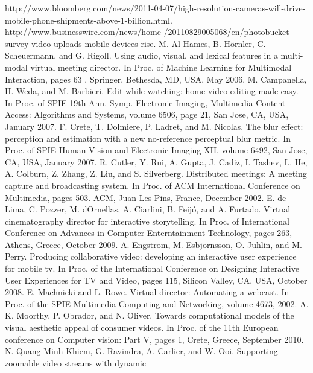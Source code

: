 \documentclass{new}
\begin{document}
\begin{thebibliography}{9}
http://www.bloomberg.com/news/2011-04-07/high-resolution-cameras-will-drive-mobile-phone-shipments-above-1-billion.html.
http://www.businesswire.com/news/home
/20110829005068/en/photobucket-survey-video-uploads-mobile-devices-rise. 
M. Al-Hames, B. H\"{o}rnler, C. Scheuermann, and G. Rigoll. Using audio, visual, and lexical features in a multi-modal
virtual meeting director. In Proc. of Machine Learning for
Multimodal Interaction, pages 63 . Springer, Bethesda,
MD, USA, May 2006.
M. Campanella, H. Weda, and M. Barbieri. Edit while
watching: home video editing made easy. In Proc. of SPIE
19th Ann. Symp. Electronic Imaging, Multimedia Content
Access: Algorithms and Systems, volume 6506, page 21, San
Jose, CA, USA, January 2007.
F. Crete, T. Dolmiere, P. Ladret, and M. Nicolas. The blur effect: perception and estimation with a new no-reference
perceptual blur metric. In Proc. of SPIE Human Vision and
Electronic Imaging XII, volume 6492, San Jose, CA, USA,
January 2007.
R. Cutler, Y. Rui, A. Gupta, J. Cadiz, I. Tashev, L. He, A. Colburn, Z. Zhang, Z. Liu, and S. Silverberg. Distributed
meetings: A meeting capture and broadcasting system. In
Proc. of ACM International Conference on Multimedia,
pages 503. ACM, Juan Les Pins, France, December
2002.
E. de Lima, C. Pozzer, M. d\textquotesingle Ornellas, A. Ciarlini, B. Feij\'{o}, and A. Furtado. Virtual cinematography director for interactive storytelling. In Proc. of International Conference
on Advances in Computer Enterntainment Technology, pages
263, Athens, Greece, October 2009.
A. Engstrom, M. Esbjornsson, O. Juhlin, and M. Perry.
Producing collaborative video: developing an interactive user
experience for mobile tv. In Proc. of the International
Conference on Designing Interactive User Experiences for
TV and Video, pages 115, Silicon Valley, CA, USA,
October 2008.
E. Machnicki and L. Rowe. Virtual director: Automating a webcast. In Proc. of the SPIE Multimedia Computing and Networking, volume 4673, 2002.
A. K. Moorthy, P. Obrador, and N. Oliver. Towards
computational models of the visual aesthetic appeal of
consumer videos. In Proc. of the 11th European conference
on Computer vision: Part V, pages 1, Crete, Greece,
September 2010.
N. Quang Minh Khiem, G. Ravindra, A. Carlier, and W. Ooi. Supporting zoomable video streams with dynamic

\end{thebibliography}
\end{document}
